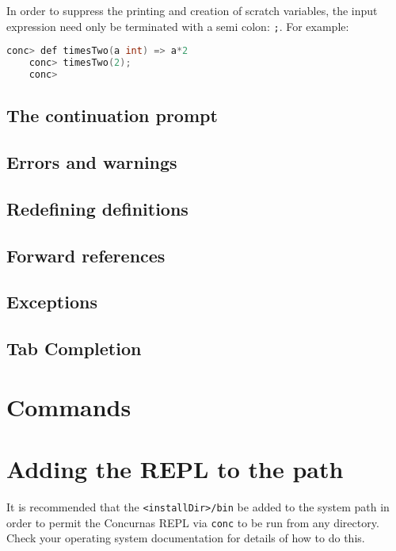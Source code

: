 \documentclass[conc-doc]{subfiles}
\begin{document}
	In order to suppress the printing and creation of scratch variables, the input expression need only be terminated with a semi colon: \lstinline{;}. For example:
	
	\begin{lstlisting}[language=C]
	conc> def timesTwo(a int) => a*2
	conc> timesTwo(2);
	conc> 
	\end{lstlisting}
	
	
	
	
	
	\subsection{The continuation prompt}
	
	
	
	
	
	\subsection{Errors and warnings}
	
	
	\subsection{Redefining definitions}
	
	
	\subsection{Forward references}
	
	\subsection{Exceptions}
	
	\subsection{Tab Completion}
	
	\section{Commands}
	
	
	
	\section{Adding the REPL to the path}
	It is recommended that the \lstinline{<installDir>/bin} be added to the system path in order to permit the Concurnas REPL via \lstinline{conc} to be run from any directory. Check your operating system documentation for details of how to do this.
	
	
	
\end{document}
